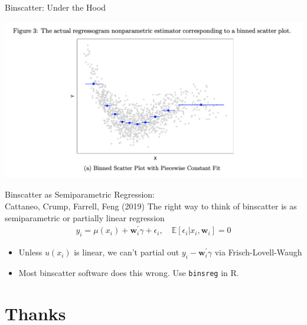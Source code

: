 \documentclass[xcolor=pdftex,dvipsnames,table,mathserif,aspectratio=169]{beamer}
\begin{document}
\begin{frame}{Binscatter: Under the Hood}
\begin{center}
\includegraphics[height=0.9\textheight]{./resources/bs1.png}
\end{center}
\end{frame}


\begin{frame}{Binscatter as Semiparametric Regression:\\
\small Cattaneo, Crump, Farrell, Feng (2019)}
The right way to think of binscatter is as \alert{semiparametric} or \alert{partially linear} regression
\begin{align*}
y_{i}=\mu\left(x_{i}\right)+\mathbf{w}_{i}^{\prime} \gamma+\epsilon_{i}, \quad \mathbb{E}\left[\epsilon_{i} | x_{i}, \mathbf{w}_{i}\right]=0
\end{align*}
\begin{itemize}
\item Unless $u(x_i)$ is linear, we can't partial out $y_i -\mathbf{w}_{i}^{\prime} \gamma$ via Frisch-Lovell-Waugh
\item Most binscatter software does this wrong. Use \texttt{binsreg} in R.
\end{itemize}
\end{frame}

\section{Thanks}


\end{document}
